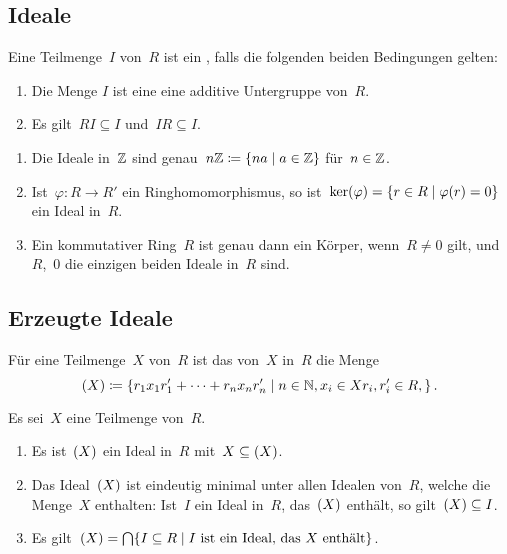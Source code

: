 \subsection{Ideale}

\begin{definition}
  Eine Teilmenge~$I$ von~$R$ ist ein , falls die folgenden beiden Bedingungen gelten:
  \begin{enumerate}
    \item
      Die Menge $I$ ist eine eine additive Untergruppe von~$R$.
    \item
      Es gilt~$RI \subseteq I$ und~$IR \subseteq I$.
  \end{enumerate}
\end{definition}

\begin{example}
  \leavevmode
  \begin{enumerate}
    \item
      Die Ideale in~$\mathbb{Z}$ sind genau~$n \Integer \defined \{ na \suchthat a \in \Integer \}$ für~$n \in \mathbb{Z}$.
    \item
      Ist~$\varphi \colon R \to R'$ ein Ringhomomorphismus, so ist~$\ker(\varphi) = \{ r \in R \suchthat \varphi(r) = 0 \}$ ein Ideal in~$R$.
    \item
      Ein kommutativer Ring~$R$ ist genau dann ein Körper, wenn~$R \neq 0$ gilt, und~$R$,~$0$ die einzigen beiden Ideale in~$R$ sind.
  \end{enumerate}
\end{example}



\subsection{Erzeugte Ideale}

\begin{definition}
  Für eine Teilmenge~$X$ von~$R$ ist das von~$X$ in~$R$  die Menge
  \[
    \genideal{X}
    \defined
    \{
      r_1 x_1 r'_1 + \dotsb + r_n x_n r'_n
    \suchthat
      n \in \Natural,
      x_i \in X
      r_i, r'_i \in R,
    \} \,.
  \]
\end{definition}

\begin{proposition}
  Es sei~$X$ eine Teilmenge von~$R$.
  \begin{enumerate}
    \item
      Es ist~$(X)$ ein Ideal in~$R$ mit~$X \subseteq (X)$.
    \item
      Das Ideal~$(X)$ ist eindeutig minimal unter allen Idealen von~$R$, welche die Menge~$X$ enthalten:
      Ist~$I$ ein Ideal in~$R$, das~$(X)$ enthält, so gilt~$(X) \subseteq I$.
    \item
      Es gilt~$\genideal{X} = \bigcap \{ I \subseteq R \suchthat \text{$I$ ist ein Ideal, das~$X$ enthält} \}$.
  \end{enumerate}
\end{proposition}



